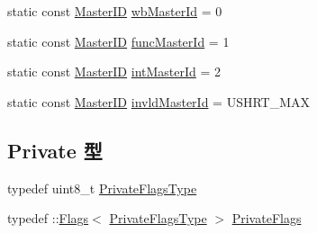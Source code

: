 \begin{Indent}{\bf }\par
{\em \label{_amgrpd41d8cd98f00b204e9800998ecf8427e}
 }\begin{DoxyCompactItemize}
\item 
static const \hyperlink{request_8hh_ac366b729262fd8e7cbd3283da6f775cf}{MasterID} \hyperlink{classRequest_abdfbeedab7040f62557e767ff4e79063}{wbMasterId} = 0
\item 
static const \hyperlink{request_8hh_ac366b729262fd8e7cbd3283da6f775cf}{MasterID} \hyperlink{classRequest_a2d69ed2b2928ccd91cc225b403200c4e}{funcMasterId} = 1
\item 
static const \hyperlink{request_8hh_ac366b729262fd8e7cbd3283da6f775cf}{MasterID} \hyperlink{classRequest_a6af77aa9f96123442112081a9248f2e8}{intMasterId} = 2
\item 
static const \hyperlink{request_8hh_ac366b729262fd8e7cbd3283da6f775cf}{MasterID} \hyperlink{classRequest_a1bb5b2ea96370ac4071dbe85cc9883c8}{invldMasterId} = USHRT\_\-MAX
\end{DoxyCompactItemize}
\end{Indent}
\subsection*{Private 型}
\begin{DoxyCompactItemize}
\item 
typedef uint8\_\-t \hyperlink{classRequest_ae45e5883b1d9912cc794fd219c392cc3}{PrivateFlagsType}
\item 
typedef ::\hyperlink{classFlags}{Flags}$<$ \hyperlink{classRequest_ae45e5883b1d9912cc794fd219c392cc3}{PrivateFlagsType} $>$ \hyperlink{classRequest_a1a6d0badb5909edf711053302528cd2a}{PrivateFlags}
\end{DoxyCompactItemize}
